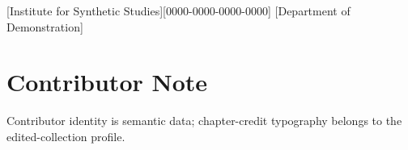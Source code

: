 \documentclass[10pt,twoside,openany]{book}
\begin{document}
[Institute for Synthetic Studies][0000-0000-0000-0000]
[Department of Demonstration]
\PSEBeginFrontMatter
\PSETitlePage
\PSEPublicationPage
\tableofcontents
\clearpage
\PSEBeginBody



\PSEBeginBackMatter
\chapter*{Contributor Note}
Contributor identity is semantic data; chapter-credit typography belongs to the edited-collection profile.
\PSEPrintIndex
\end{document}
